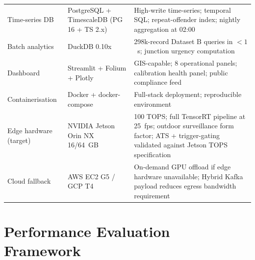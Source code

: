 \documentclass[11pt,a4paper]{article}
\begin{document}
\begin{longtable}{L{3.5cm} L{4.5cm} L{6.5cm}}
    Time-series DB & PostgreSQL + TimescaleDB (PG 16 + TS 2.x) & High-write time-series; temporal SQL; repeat-offender index; nightly aggregation at 02:00 \\
    Batch analytics & DuckDB 0.10x & 298k-record Dataset B queries in $< 1$~s; junction urgency computation \\
    Dashboard & Streamlit + Folium + Plotly & GIS-capable; 8 operational panels; calibration health panel; public compliance feed \\
    Containerisation & Docker + docker-compose & Full-stack deployment; reproducible environment \\
    Edge hardware (target) & NVIDIA Jetson Orin NX 16/64~GB & 100 TOPS; full TensorRT pipeline at 25~fps; outdoor surveillance form factor; ATS + trigger-gating validated against Jetson TOPS specification \\
    Cloud fallback & AWS EC2 G5 / GCP T4 & On-demand GPU offload if edge hardware unavailable; Hybrid Kafka payload reduces egress bandwidth requirement \\
\end{longtable}

\section{Performance Evaluation Framework}
\end{document}
